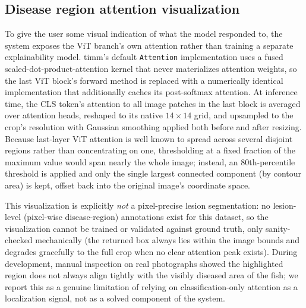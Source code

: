 \documentclass[conference]{IEEEtran}
\begin{document}
\subsection{Disease region attention visualization}
To give the user some visual indication of what the model responded to, the system exposes the ViT branch's own attention rather than training a separate explainability model. timm's default \texttt{Attention} implementation uses a fused scaled-dot-product-attention kernel that never materializes attention weights, so the last ViT block's forward method is replaced with a numerically identical implementation that additionally caches its post-softmax attention. At inference time, the CLS token's attention to all image patches in the last block is averaged over attention heads, reshaped to its native $14\times14$ grid, and upsampled to the crop's resolution with Gaussian smoothing applied both before and after resizing. Because last-layer ViT attention is well known to spread across several disjoint regions rather than concentrating on one, thresholding at a fixed fraction of the maximum value would span nearly the whole image; instead, an 80th-percentile threshold is applied and only the single largest connected component (by contour area) is kept, offset back into the original image's coordinate space.

This visualization is explicitly \emph{not} a pixel-precise lesion segmentation: no lesion-level (pixel-wise disease-region) annotations exist for this dataset, so the visualization cannot be trained or validated against ground truth, only sanity-checked mechanically (the returned box always lies within the image bounds and degrades gracefully to the full crop when no clear attention peak exists). During development, manual inspection on real photographs showed the highlighted region does not always align tightly with the visibly diseased area of the fish; we report this as a genuine limitation of relying on classification-only attention as a localization signal, not as a solved component of the system.
\end{document}
